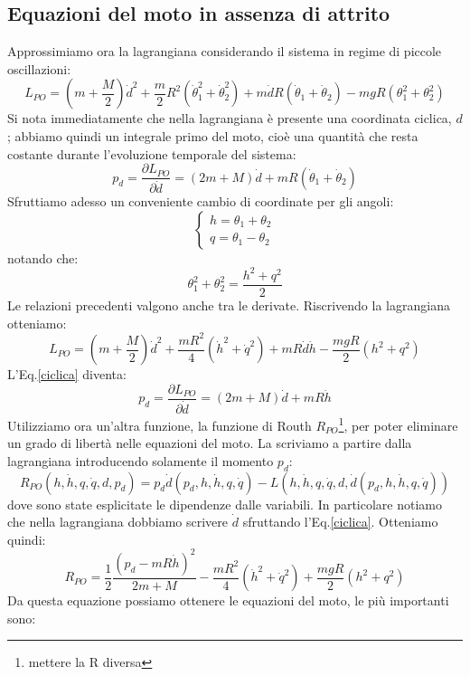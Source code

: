 \documentclass[11pt, a4paper, twoside]{article}
\begin{document}
\subsection{Equazioni del moto in assenza di attrito}
Approssimiamo ora la lagrangiana considerando il sistema in regime di piccole oscillazioni:
$$
L_{PO} =  \left(m+ \frac{M}{2}\right) \dot{d}^2 + \frac{m}{2} R^2 (\dot\theta_1^2 + \dot\theta_2^2) + m \dot{d} R (\dot \theta_1 + \dot \theta_2) - mgR(\theta_1^2 + \theta_2^2)
$$
Si nota immediatamente che nella lagrangiana è presente una coordinata ciclica, $d$; abbiamo quindi un integrale primo del moto, cioè una quantità che resta costante durante 
l'evoluzione temporale del sistema:
\begin{equation}
p_d = \frac{\partial L_{PO}}{\partial \dot{d}} =(2m+M) \dot d + m R (\dot\theta_1 + \dot \theta_2)
\label{ciclica}
\end{equation}
Sfruttiamo adesso un conveniente cambio di coordinate per gli angoli:
$$ 
\left\{\begin{array}{lr}
  h = \theta_1 + \theta_2 \\
  q = \theta_1 - \theta_2
\end{array}\right.
$$ 
notando che:
$$
  \theta_1^2 + \theta_2^2 = \frac{h^2 +q^2}{2}
$$ 
Le relazioni precedenti valgono anche tra le derivate.
Riscrivendo la lagrangiana otteniamo:
$$
L_{PO} =  \left(m+ \frac{M}{2}\right) \dot{d}^2 + \frac{mR^2}{4}  (\dot{h}^2 + \dot{q}^2) + m  R \dot{d}\dot{h} - \frac{mgR}{2}(h^2 + q^2)
$$
L'Eq.\ref{ciclica} diventa:
\begin{equation}
  p_d = \frac{\partial L_{PO}}{\partial \dot{d}} =(2m+M) \dot d + m R \dot h
  \label{ciclicapost}
\end{equation}
Utilizziamo ora un'altra funzione, la funzione di Routh $R_{PO}$\footnote{mettere la R diversa}, per poter eliminare 
un grado di libertà nelle equazioni del moto. La scriviamo a partire dalla lagrangiana introducendo solamente il
momento $p_d$:
$$
R_{PO}(h,\dot h, q, \dot q, d, p_d )  = 
p_d \dot{d}(p_d, h,\dot h, q, \dot q)- L(h,\dot h, q, \dot q, d, \dot{d}(p_d, h,\dot h, q, \dot q))
$$
dove sono state esplicitate le dipendenze dalle variabili. 
In particolare notiamo che nella lagrangiana dobbiamo scrivere $\dot d$ sfruttando l'Eq.\ref{ciclica}.
Otteniamo quindi:
\begin{equation}
  R_{PO} = \frac{1}{2} \frac{(p_d -mR\dot h)^2}{2m + M}- \frac{mR^2}{4}  (\dot{h}^2 + \dot{q}^2) + \frac{mgR}{2}(h^2 + q^2)
    \label{routh}
\end{equation}
Da questa equazione possiamo ottenere le equazioni del moto, le più importanti sono:
\end{document}
